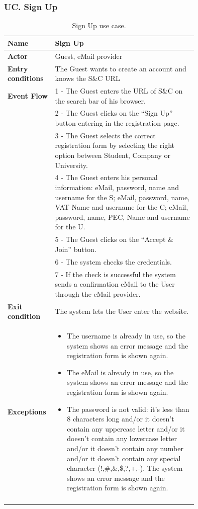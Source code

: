 \subsubsection*{UC\cuc . Sign Up}
\begin{center}
    \begin{longtable}{|l|p{0.75\linewidth}|}
        \hline
        \textbf{Name}               & Sign Up\\
        \hline
        \textbf{Actor}              & Guest, eMail provider\\
        \hline
        \textbf{Entry conditions}   & The Guest wants to create an account and knows the S\&C URL\\
        \hline
        \textbf{Event Flow}         & 1 - The Guest enters the URL of S\&C on the search bar of his browser.    \\
        & 2 - The Guest clicks on the “Sign Up” button entering in the registration page.    \\
        & 3 - The Guest selects the correct registration form by selecting the right option between Student, Company or University. \\
        & 4 - The Guest enters his personal information: eMail, password, name and username for the S; eMail, password, name, VAT Name and username for the C; eMail, password, name, PEC, Name and username for the U. \\
        & 5 - The Guest clicks on the “Accept \& Join” button.  \\
        & 6 - The system checks the credentials.    \\
        & 7 - If the check is successful the system sends a confirmation eMail to the User through the eMail provider.  \\
        \hline
        \textbf{Exit condition}   & The system lets the User enter the website. \\       
        \hline
        \textbf{Exceptions}       & \begin{itemize}
            \item The username is already in use, so the system shows an error message and the registration form is shown again.
            \item The eMail is already in use, so the system shows an error message and the registration form is shown again.
            \item The password is not valid: it’s less than 8 characters long and/or it doesn’t contain any uppercase letter and/or it doesn’t contain any lowercase letter and/or it doesn’t contain any number and/or it doesn’t contain any special character (!,\#,\&,\$,?,+,-). The system shows an error message and the registration form is shown again.
        \end{itemize}\\
        \hline
        \caption{Sign Up use case.}
        \label{tab: sign_up_use_case}
    \end{longtable}
\end{center}


